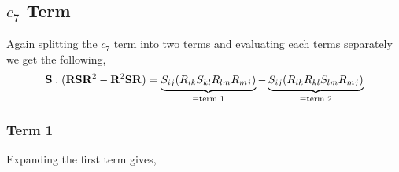 \subsection{$c_7$ Term}
Again splitting the $c_{7}$ term into two terms and evaluating each terms
separately we get the following,
\begin{equation}
    \mathbf{S} : (\mathbf{R} \mathbf{S} \mathbf{R}^2 - \mathbf{R}^2 \mathbf{S} \mathbf{R}) =
                \underbrace{ S_{ij} (R_{ik} S_{kl} R_{lm} R_{mj})}_{\equiv \text{term 1}} - 
                \underbrace{ S_{ij} (R_{ik} R_{kl} S_{lm} R_{mj})}_{\equiv \text{term 2}}
\end{equation}
\subsubsection{Term 1}
Expanding the first term gives,
